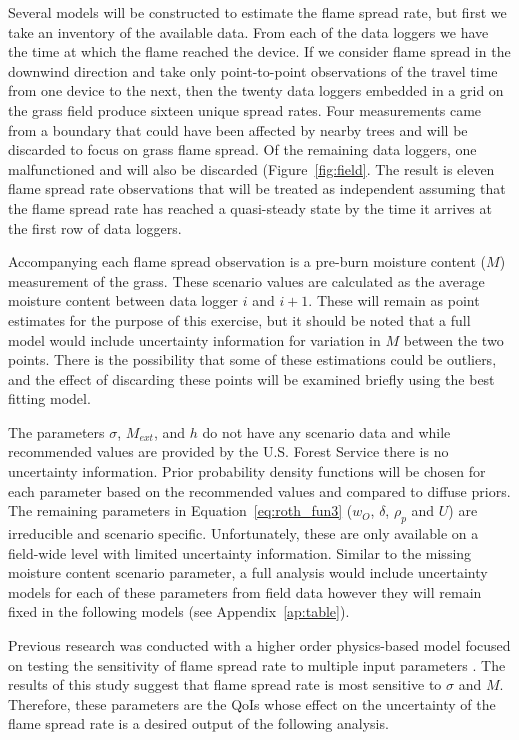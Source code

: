 \documentclass[11pt]{article}
\begin{document}
Several models will be constructed to estimate the flame spread rate, but first we take an inventory of the available data. From each of the data loggers we have the time at which the flame reached the device. If we consider flame spread in the downwind direction and take only point-to-point observations of the travel time from one device to the next, then the twenty data loggers embedded in a grid on the grass field produce sixteen unique spread rates. Four measurements came from a boundary that could have been affected by nearby trees and will be discarded to focus on grass flame spread. Of the remaining data loggers, one malfunctioned and will also be discarded (Figure~\ref{fig:field}. The result is eleven flame spread rate observations that will be treated as independent assuming that the flame spread rate has reached a quasi-steady state by the time it arrives at the first row of data loggers.

Accompanying each flame spread observation is a pre-burn moisture content ($M$) measurement of the grass. These scenario values are calculated as the average moisture content between data logger $i$ and $i+1$. These will remain as point estimates for the purpose of this exercise, but it should be noted that a full model would include uncertainty information for variation in $M$ between the two points. There is the possibility that some of these estimations could be outliers, and the effect of discarding these points will be examined briefly using the best fitting model.

The parameters $\sigma$, $M_{ext}$, and $h$ do not have any scenario data and while recommended values are provided by the U.S. Forest Service \cite{scott2005standard} there is no uncertainty information. Prior probability density functions will be chosen for each parameter based on the recommended values and compared to diffuse priors. The remaining parameters in Equation~\ref{eq:roth_fun3} ($w_O$, $\delta$, $\rho_p$ and $U$) are irreducible and scenario specific. Unfortunately, these are only available on a field-wide level with limited uncertainty information. Similar to the missing moisture content scenario parameter, a full analysis would include uncertainty models for each of these parameters from field data however they will remain fixed in the following models (see Appendix~\ref{ap:table}).

Previous research was conducted with a higher order physics-based model focused on testing the sensitivity of flame spread rate to multiple input parameters \cite{overholtcharacterization}. The results of this study suggest that flame spread rate is most sensitive to $\sigma$ and $M$. Therefore, these parameters are the QoIs whose effect on the uncertainty of the flame spread rate is a desired output of the following analysis.
\end{document}
